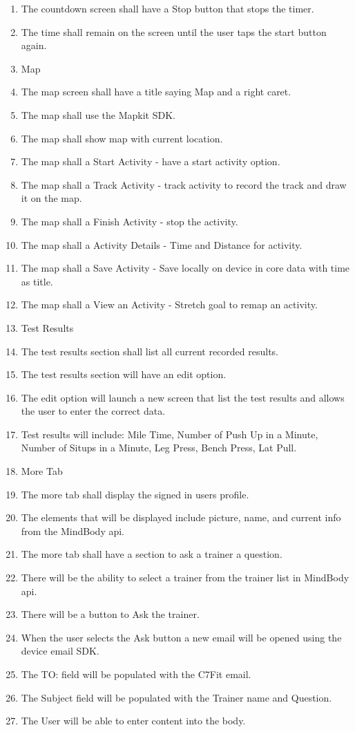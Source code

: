 \documentclass[letterpaper,10pt,titlepage]{article}
\begin{document}
\begin{enumerate}
\item The countdown screen shall have a Stop button that stops the timer.
\item The time shall remain on the screen until the user taps the start button again.
\item Map
\item The map screen shall have a title saying Map and a right caret.
\item The map shall use the Mapkit SDK.
\item The map shall show map with current location.
\item The map shall a Start Activity - have a start activity option.
\item The map shall a Track Activity - track activity to record the track and draw it on the map.
\item The map shall a Finish Activity - stop the activity.
\item The map shall a Activity Details - Time and Distance for activity.
\item The map shall a Save Activity - Save locally on device in core data with time as title.
\item The map shall a View an Activity - Stretch goal to remap an activity.
\item Test Results
\item The test results section shall list all current recorded results.
\item The test results section will have an edit option.
\item The edit option will launch a new screen that list the test results and allows the user to enter the correct data.
\item Test results will include:  Mile Time, Number of Push Up in a Minute, Number of Situps in a Minute, Leg Press, Bench Press, Lat Pull.
\item More Tab
\item The more tab shall display the signed in users profile.
\item The elements that will be displayed include picture, name, and current info from the MindBody api.
\item The more tab shall have a section to ask a trainer a question.
\item There will be the ability to select a trainer from the trainer list in MindBody api.
\item There will be a button to Ask the trainer.
\item When the user selects the Ask button a new email will be opened using the device email SDK.
\item The TO: field will be populated with the C7Fit email.
\item The Subject field will be populated with the Trainer name and Question.
\item The User will be able to enter content into the body.
\end{enumerate}
\end{document}
